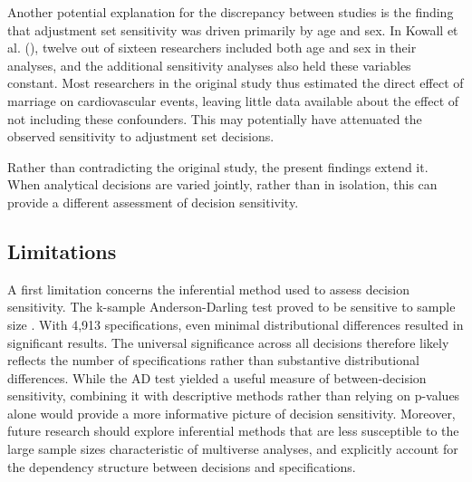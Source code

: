 \documentclass[
  man,
  floatsintext,
  longtable,
  nolmodern,
  notxfonts,
  notimes,
  colorlinks=true,linkcolor=blue,citecolor=blue,urlcolor=blue]{apa7}
\begin{document}
Another potential explanation for the discrepancy between studies is the
finding that adjustment set sensitivity was driven primarily by age and
sex. In Kowall et al. (), twelve
out of sixteen researchers included both age and sex in their analyses,
and the additional sensitivity analyses also held these variables
constant. Most researchers in the original study thus estimated the
direct effect of marriage on cardiovascular events, leaving little data
available about the effect of not including these confounders. This may
potentially have attenuated the observed sensitivity to adjustment set
decisions.

Rather than contradicting the original study, the present findings
extend it. When analytical decisions are varied jointly, rather than in
isolation, this can provide a different assessment of decision
sensitivity.

\subsection{Limitations}\label{limitations}

A first limitation concerns the inferential method used to assess
decision sensitivity. The k-sample Anderson-Darling test proved to be
sensitive to sample size . With 4,913 specifications, even minimal
distributional differences resulted in significant results. The
universal significance across all decisions therefore likely reflects
the number of specifications rather than substantive distributional
differences. While the AD test yielded a useful measure of
between-decision sensitivity, combining it with descriptive methods
rather than relying on p-values alone would provide a more informative
picture of decision sensitivity. Moreover, future research should
explore inferential methods that are less susceptible to the large
sample sizes characteristic of multiverse analyses, and explicitly
account for the dependency structure between decisions and
specifications.
\end{document}
